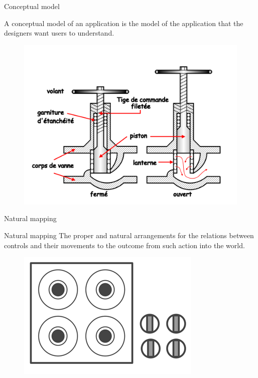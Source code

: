 \documentclass{beamer}
\begin{document}
\begin{frame}{Conceptual model}
\begin{block}
A conceptual model of an application is the model of the application that the designers want users to understand.%
\end{block}

\begin{figure}[ht]
\centering
\includegraphics[scale=0.2]{robinetzoomed.png}
\end{figure}
\end{frame}


\begin{frame}{Natural mapping}
\begin{block}{Natural mapping}
	The proper and natural arrangements for the relations between controls and their 	movements to the outcome from such action into the world.
	\end{block}
	\begin{figure}[ht]
	\includegraphics[scale=0.3]{stove_natural.png}
	\end{figure}
	\end{frame}
\end{document}

